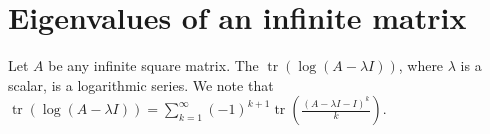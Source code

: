 %
%
%
%
%
%
%
%
%
%
%



\bigskip
\section{Eigenvalues of an infinite matrix }

Let $A$ be any infinite square matrix. The $\operatorname{tr}(\log(A - \lambda I))$, where $\lambda$ is a scalar, is a logarithmic series. We note that $\operatorname{tr}(\log(A - \lambda I)) = \sum_{k=1}^{\infty} (-1)^{k+1}\operatorname{tr}(\frac{(A-\lambda I-I)^k}{k})$. 

